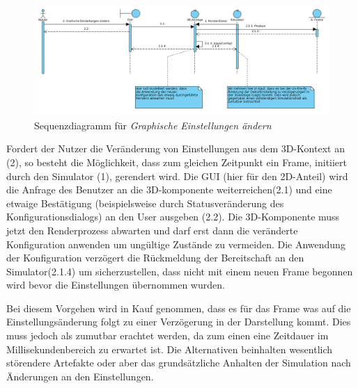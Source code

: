 \begin{figure}
\includegraphics[width=16cm]{bilder/change_graphic_config}
\caption{Sequenzdiagramm für \textit{Graphische Einstellungen ändern}}
\label{labelname}
\end{figure}
Fordert der Nutzer die Veränderung von Einstellungen aus dem 3D-Kontext an (2), so besteht die Möglichkeit, dass zum gleichen Zeitpunkt ein Frame, initiiert durch den Simulator (1), gerendert wird. 
Die GUI (hier für den 2D-Anteil) wird die Anfrage des Benutzer an die 3D-komponente weiterreichen(2.1) und eine etwaige Bestätigung (beispielsweise durch Statusveränderung des Konfigurationsdialogs) an den 
User ausgeben (2.2). Die 3D-Komponente muss jetzt den Renderprozess abwarten und darf erst dann die veränderte Konfiguration anwenden um ungültige Zustände zu vermeiden. Die Anwendung der Konfiguration verzögert 
die Rückmeldung der Bereitschaft an den Simulator(2.1.4) um sicherzustellen, dass nicht mit einem neuen Frame begonnen wird bevor die Einstellungen übernommen wurden. 

Bei diesem Vorgehen wird in Kauf genommen, dass es für das Frame was auf die Einstellungsänderung folgt zu einer Verzögerung in der Darstellung kommt. Dies muss jedoch als zumutbar erachtet werden, da zum einen
eine Zeitdauer im Millisekundenbereich zu erwartet ist. Die Alternativen beinhalten wesentlich störendere Artefakte oder aber das grundsätzliche Anhalten der Simulation nach Änderungen an den Einstellungen.

